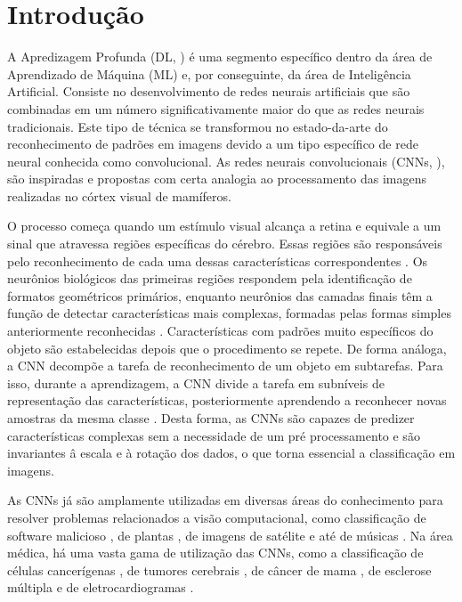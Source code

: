 \documentclass[a4,12pt]{horizon-theme}
\begin{document}
\horizonCover

\horizonTitle

\horizonAbstract

\newpage



\onehalfspacing
\section{Introdução}
A Apredizagem Profunda (DL, \cite{Goodfellow2016}) é uma segmento específico dentro da área de Aprendizado de Máquina (ML) e, por conseguinte, da área de Inteligência Artificial. Consiste no desenvolvimento de redes neurais artificiais que são combinadas em um número significativamente maior do que as redes neurais tradicionais. Este tipo de técnica se transformou no estado-da-arte do reconhecimento de padrões em imagens devido a um tipo específico de rede neural conhecida como convolucional.
As redes neurais convolucionais (CNNs, \cite{lecun2015deep}), são inspiradas e propostas com certa analogia ao processamento das imagens realizadas no córtex visual de mamíferos.

O processo começa quando um estímulo visual alcança a retina e equivale a um sinal que atravessa regiões específicas do cérebro. Essas regiões são responsáveis pelo reconhecimento de cada uma dessas características correspondentes \citep{karpathy2016convolutional}.
Os neurônios biológicos das primeiras regiões respondem pela identificação de formatos geométricos primários, enquanto neurônios das camadas finais têm a função de detectar características mais complexas, formadas pelas formas simples anteriormente reconhecidas \citep{vedaldi2015matconvnet}. Características com padrões muito específicos do objeto são estabelecidas depois que o procedimento se repete. De forma análoga, a CNN decompõe a tarefa de reconhecimento de um objeto em subtarefas. Para isso, durante a aprendizagem, a CNN divide a tarefa em subníveis de representação das características, posteriormente aprendendo a reconhecer novas amostras da mesma classe  \citep{lecun2015deep,vedaldi2015matconvnet}.
Desta forma, as CNNs são capazes de predizer características complexas sem a necessidade de um pré processamento e são invariantes â escala e à rotação dos dados, o que torna essencial a classificação em imagens.

As CNNs já são amplamente utilizadas em diversas áreas do conhecimento para resolver problemas relacionados a visão computacional, como classificação de software malicioso \citep{VGG16Ex01}, de plantas \citep{VGG16Ex02}, de imagens de satélite \citep{InceptionResNetV2Ex01} e até de músicas \citep{DenseNetEx05}. Na área médica, há uma vasta gama de utilização das CNNs, como a classificação de células cancerígenas \citep{InceptionResNetV2Ex03}, de tumores cerebrais \citep{VGG16Ex03}, de câncer de mama \citep{DenseNetEx01}, de esclerose múltipla \citep{DenseNetEx03} e de eletrocardiogramas \citep{EfficientNetEx01}.
\end{document}
